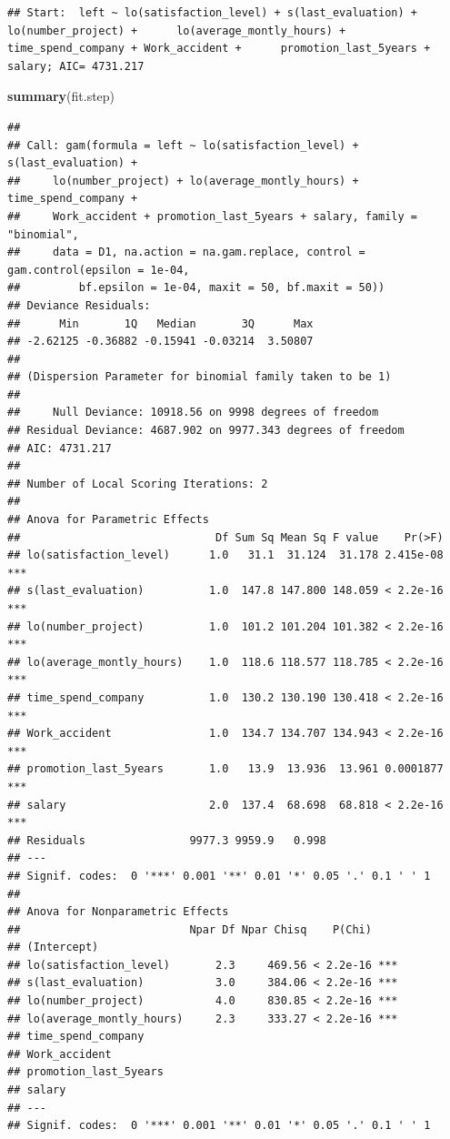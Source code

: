 \documentclass[
  11pt,
]{article}
\newenvironment{Shaded}{\begin{snugshade}}{\end{snugshade}}
\newcommand{\FunctionTok}[1]{\textcolor[rgb]{0.13,0.29,0.53}{\textbf{#1}}}
\newcommand{\NormalTok}[1]{#1}
\begin{document}
\begin{verbatim}
## Start:  left ~ lo(satisfaction_level) + s(last_evaluation) + lo(number_project) +      lo(average_montly_hours) + time_spend_company + Work_accident +      promotion_last_5years + salary; AIC= 4731.217
\end{verbatim}

\begin{Shaded}
\begin{Highlighting}[]
\FunctionTok{summary}\NormalTok{(fit.step)}
\end{Highlighting}
\end{Shaded}

\begin{verbatim}
## 
## Call: gam(formula = left ~ lo(satisfaction_level) + s(last_evaluation) + 
##     lo(number_project) + lo(average_montly_hours) + time_spend_company + 
##     Work_accident + promotion_last_5years + salary, family = "binomial", 
##     data = D1, na.action = na.gam.replace, control = gam.control(epsilon = 1e-04, 
##         bf.epsilon = 1e-04, maxit = 50, bf.maxit = 50))
## Deviance Residuals:
##      Min       1Q   Median       3Q      Max 
## -2.62125 -0.36882 -0.15941 -0.03214  3.50807 
## 
## (Dispersion Parameter for binomial family taken to be 1)
## 
##     Null Deviance: 10918.56 on 9998 degrees of freedom
## Residual Deviance: 4687.902 on 9977.343 degrees of freedom
## AIC: 4731.217 
## 
## Number of Local Scoring Iterations: 2 
## 
## Anova for Parametric Effects
##                              Df Sum Sq Mean Sq F value    Pr(>F)    
## lo(satisfaction_level)      1.0   31.1  31.124  31.178 2.415e-08 ***
## s(last_evaluation)          1.0  147.8 147.800 148.059 < 2.2e-16 ***
## lo(number_project)          1.0  101.2 101.204 101.382 < 2.2e-16 ***
## lo(average_montly_hours)    1.0  118.6 118.577 118.785 < 2.2e-16 ***
## time_spend_company          1.0  130.2 130.190 130.418 < 2.2e-16 ***
## Work_accident               1.0  134.7 134.707 134.943 < 2.2e-16 ***
## promotion_last_5years       1.0   13.9  13.936  13.961 0.0001877 ***
## salary                      2.0  137.4  68.698  68.818 < 2.2e-16 ***
## Residuals                9977.3 9959.9   0.998                      
## ---
## Signif. codes:  0 '***' 0.001 '**' 0.01 '*' 0.05 '.' 0.1 ' ' 1
## 
## Anova for Nonparametric Effects
##                          Npar Df Npar Chisq    P(Chi)    
## (Intercept)                                              
## lo(satisfaction_level)       2.3     469.56 < 2.2e-16 ***
## s(last_evaluation)           3.0     384.06 < 2.2e-16 ***
## lo(number_project)           4.0     830.85 < 2.2e-16 ***
## lo(average_montly_hours)     2.3     333.27 < 2.2e-16 ***
## time_spend_company                                       
## Work_accident                                            
## promotion_last_5years                                    
## salary                                                   
## ---
## Signif. codes:  0 '***' 0.001 '**' 0.01 '*' 0.05 '.' 0.1 ' ' 1
\end{verbatim}
\end{document}
